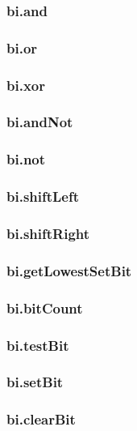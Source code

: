\subsubsection*{bi.\+and}

\subsubsection*{bi.\+or}

\subsubsection*{bi.\+xor}

\subsubsection*{bi.\+and\+Not}

\subsubsection*{bi.\+not}

\subsubsection*{bi.\+shift\+Left}

\subsubsection*{bi.\+shift\+Right}

\subsubsection*{bi.\+get\+Lowest\+Set\+Bit}

\subsubsection*{bi.\+bit\+Count}

\subsubsection*{bi.\+test\+Bit}

\subsubsection*{bi.\+set\+Bit}

\subsubsection*{bi.\+clear\+Bit}

